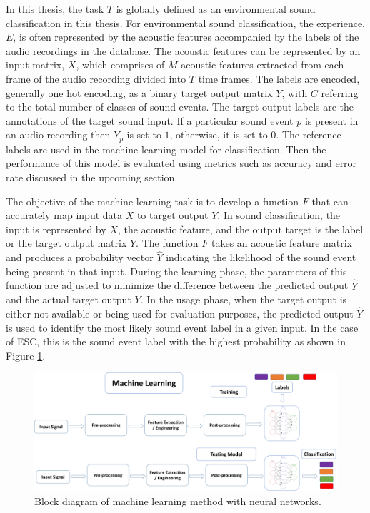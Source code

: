 In this thesis, the task $T$ is globally defined as an environmental sound classification in this thesis. For environmental sound classification, the experience, $E$, is often represented by the acoustic features accompanied by the labels of the audio recordings in the database.  The acoustic features can be represented by an input matrix, $X$, which comprises of $M$ acoustic features extracted from each frame of the audio recording divided into $T$ time frames. The labels are encoded, generally one hot encoding, as a binary target output matrix $Y$, with $C$ referring to the total number of classes of sound events. The target output labels are the annotations of the target sound input. If a particular sound event $p$ is present in an audio recording then $Y_p$ is set to $1$, otherwise, it is set to $0$. The reference labels are used in the machine learning model for classification. Then the performance of this model is evaluated using metrics such as accuracy and error rate discussed in the upcoming section. 


The objective of the machine learning task is to develop a function $F$ that can accurately map input data $X$ to target output $Y$. In sound classification, the input is represented by $X$, the acoustic feature, and the output target is the label or the target output matrix $Y$. The function $F$ takes an acoustic feature matrix and produces a probability vector $\hat{Y}$ indicating the likelihood of the sound event being present in that input. During the learning phase, the parameters of this function are adjusted to minimize the difference between the predicted output $\hat{Y}$ and the actual target output $Y$. 
In the usage phase, when the target output is either not available or being used for evaluation purposes, the predicted output $\hat{Y}$ is used to identify the most likely sound event label in a given input. In the case of ESC, this is the sound event label with the highest probability as shown in Figure \ref{fig:Machinelearning}.


\begin{figure}[htbp]
   \begin{center}
      \includegraphics[width=1\linewidth]{Chapitre1/figures/Machinelearning2.png}
   \end{center}
   \caption{ Block diagram of machine learning method with neural networks.}
   \label{fig:Machinelearning}
\end{figure}

